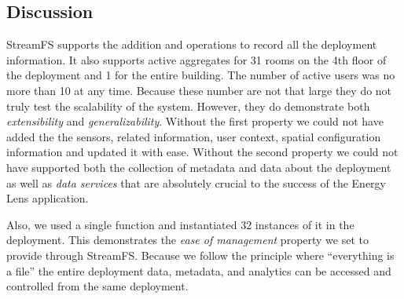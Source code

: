 \subsection{Discussion}

StreamFS supports the addition and operations to record all the deployment information.  It also supports active aggregates for 
31 rooms on the 4th floor of the deployment and 1 for the entire building.  The number of active users was no more than 10 at any time.
Because these number are not that large they do not truly test the scalability of the system.  However, they do demonstrate
both \emph{extensibility} and \emph{generalizability}.  Without the first property we could not have added the the sensors,
related information, user context, spatial configuration information and updated it with ease.  Without the second property
we could not have supported both the collection of metadata and data about the deployment as well as \emph{data services} that
are absolutely crucial to the success of the Energy Lens application.

Also, we used a single function and instantiated 32 instances of it in the deployment.  This demonstrates the \emph{ease of management}
property we set to provide through StreamFS.  Because we follow the principle where ``everything is a file'' the entire deployment
data, metadata, and analytics can be accessed and controlled from the same deployment.














